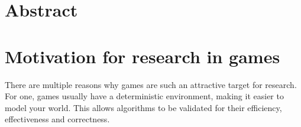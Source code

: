 \section{Abstract}



\section{Motivation for research in games}

There are multiple reasons why games are such an attractive target for research. For one, games usually have a deterministic environment, making it easier to model your world. This allows algorithms to be validated for their efficiency, effectiveness and correctness.